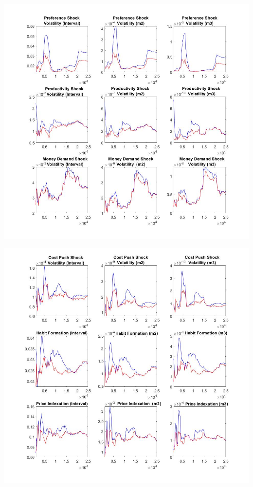 \documentclass[11pt,preprint, authoryear]{elsarticle}
\let\origfigure\figure
\let\endorigfigure\endfigure
\renewenvironment{figure}[1][2] {
    \expandafter\origfigure\expandafter[H]
} {
    \endorigfigure
}
\numberwithin{equation}{section}
\numberwithin{figure}{section}
\numberwithin{table}{section}
\begin{document}
\begin{figure}
    \centering 
    \begin{minipage}[t]{8.2cm} 
        \centering 
        \includegraphics[width=\linewidth]{mcflex1.jpg} 
    \end{minipage} 
    \hspace{0.1cm} 
    \begin{minipage}[t]{8.2cm} 
        \centering 
        \includegraphics[width=\linewidth]{mcflex2.jpg} 
    \end{minipage}
    \caption{(a) MCMC - Flexible Money Growth Rate Rule}
    \label{mcflex12}
\end{figure}
\end{document}
